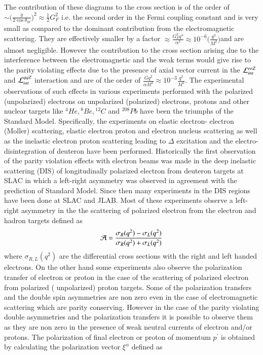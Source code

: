 The contribution of these diagrams to the  cross section is of the order of $\sim \big(\frac{g}{2\cos\theta_W}\big)^2 \approx \frac{1}{2}G_F^2$ i.e. the second order in the  Fermi coupling constant and is very small as compared to the dominant contribution from the electromagnetic scattering. They are effectively smaller by a factor $\approx \frac{G_F^2q^4}{\alpha^2}\approx 10^{-6}\big(\frac{q^2}{M^2}\big)$and are almost negligible. However the contribution to the cross section arising due to the interference between the electromagnetic and the weak terms would give rise to the parity violating effects due to the presence of axial vector current in the ${\cal L}_{int}^{eeZ}$ and ${\cal L}_{int}^{qqZ}$ interaction and are of the order of $\frac{Gq^2}{\alpha M^2}\approx 10^{-3} \frac{q^2}{M^2}$. The experimental observations of such effects in various experiments performed with the polarized (unpolarized) electrons on unpolarized (polarized) electrons, protons and other nuclear targets like ${}^4{He}, {}^8{Be}, {}^{12}{C}$ and ${}^{208}{Pb}$ have been the triumphs of the Standard Model. Specifically, the experiments on elastic electron- electron (Moller) scattering, elastic electron proton and electron nucleus scattering as well as the inelastic electron proton scattering leading to $\Delta$ excitation and the electro-disintegration of deuteron have been performed. Historically the first observation of the parity violation effects with electron beams was made in the deep inelastic scattering (DIS) of longitudinally polarized electron from deuteron targets at SLAC in which a left-right asymmetry was observed  in agreement with the prediction of Standard Model. Since then many experiments in the DIS regions  have been done at SLAC and JLAB. Most of these experiments observe a left-right asymmetry in the the scattering of polarized electron  from the electron and hadron targets defined as
\begin{equation}
{\cal A}= \frac{\sigma_R(q^2)-\sigma_L(q^2)}{\sigma_R(q^2)+\sigma_L(q^2)}  \label{chap9-eq13}
\end{equation}
where $\sigma_{R,L}(q^2)$ are the differential cross sections with the right and left handed electrons. On the other hand some experiments also observe the polarization transfer of electron or proton in the case of the scattering of polarized electron from polarized ( unpolarized) proton targets. Some of the polarization transfers and the double spin asymmetries are non zero even in the case of electromagnetic scattering which are parity conserving. However in the case of the parity violating double asymmetries and the polarization transfers it is possible to observe them as they are non zero in the presence of weak neutral currents of electron and/or protons. The polarization of final electron or proton of momentum $p^\prime$ is obtained by calculating the polarization vector $\xi^{\alpha}$ defined as 
